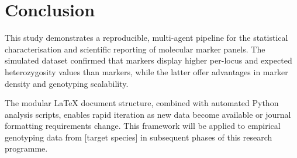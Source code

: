
\section{Conclusion}
\label{sec:conclusion}

This study demonstrates a reproducible, multi-agent pipeline for the
statistical characterisation and scientific reporting of molecular marker
panels. The simulated dataset confirmed that \ssr{} markers display
higher per-locus \pic{} and expected heterozygosity values than \snp{}
markers, while the latter offer advantages in marker density and
genotyping scalability.

The modular \LaTeX{} document structure, combined with automated Python
analysis scripts, enables rapid iteration as new data become available
or journal formatting requirements change. This framework will be applied
to empirical genotyping data from [target species] in subsequent phases
of this research programme.
